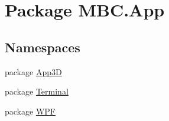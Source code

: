 \hypertarget{namespace_m_b_c_1_1_app}{\section{Package M\-B\-C.\-App}
\label{namespace_m_b_c_1_1_app}
}
\subsection*{Namespaces}
\begin{DoxyCompactItemize}
\item 
package \hyperlink{namespace_m_b_c_1_1_app_1_1_app3_d}{App3\-D}
\item 
package \hyperlink{namespace_m_b_c_1_1_app_1_1_terminal}{Terminal}
\item 
package \hyperlink{namespace_m_b_c_1_1_app_1_1_w_p_f}{W\-P\-F}
\end{DoxyCompactItemize}
